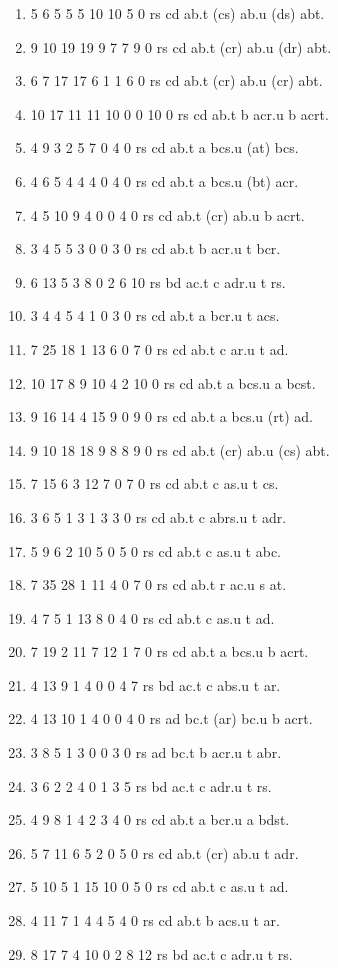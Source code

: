 \documentclass[10pt,journal]{IEEEtran}
\begin{document}
\begin{enumerate}
\item 5 6 5 5 5 10 10 5 0 rs cd ab.t (cs) ab.u (ds) abt.
\item 9 10 19 19 9 7 7 9 0 rs cd ab.t (cr) ab.u (dr) abt.
\item 6 7 17 17 6 1 1 6 0 rs cd ab.t (cr) ab.u (cr) abt.
\item 10 17 11 11 10 0 0 10 0 rs cd ab.t b acr.u b acrt.
\item 4 9 3 2 5 7 0 4 0 rs cd ab.t a bcs.u (at) bcs.
\item 4 6 5 4 4 4 0 4 0 rs cd ab.t a bcs.u (bt) acr.
\item 4 5 10 9 4 0 0 4 0 rs cd ab.t (cr) ab.u b acrt.
\item 3 4 5 5 3 0 0 3 0 rs cd ab.t b acr.u t bcr.
\item 6 13 5 3 8 0 2 6 10 rs bd ac.t c adr.u t rs.
\item 3 4 4 5 4 1 0 3 0 rs cd ab.t a bcr.u t acs.
\item 7 25 18 1 13 6 0 7 0 rs cd ab.t c ar.u t ad.
\item 10 17 8 9 10 4 2 10 0 rs cd ab.t a bcs.u a bcst.
\item 9 16 14 4 15 9 0 9 0 rs cd ab.t a bcs.u (rt) ad.
\item 9 10 18 18 9 8 8 9 0 rs cd ab.t (cr) ab.u (cs) abt.
\item 7 15 6 3 12 7 0 7 0 rs cd ab.t c as.u t cs.
\item 3 6 5 1 3 1 3 3 0 rs cd ab.t c abrs.u t adr.
\item 5 9 6 2 10 5 0 5 0 rs cd ab.t c as.u t abc.
\item 7 35 28 1 11 4 0 7 0 rs cd ab.t r ac.u s at.
\item 4 7 5 1 13 8 0 4 0 rs cd ab.t c as.u t ad.
\item 7 19 2 11 7 12 1 7 0 rs cd ab.t a bcs.u b acrt.
\item 4 13 9 1 4 0 0 4 7 rs bd ac.t c abs.u t ar.
\item 4 13 10 1 4 0 0 4 0 rs ad bc.t (ar) bc.u b acrt.
\item 3 8 5 1 3 0 0 3 0 rs ad bc.t b acr.u t abr.
\item 3 6 2 2 4 0 1 3 5 rs bd ac.t c adr.u t rs.
\item 4 9 8 1 4 2 3 4 0 rs cd ab.t a bcr.u a bdst.
\item 5 7 11 6 5 2 0 5 0 rs cd ab.t (cr) ab.u t adr.
\item 5 10 5 1 15 10 0 5 0 rs cd ab.t c as.u t ad.
\item 4 11 7 1 4 4 5 4 0 rs cd ab.t b acs.u t ar.
\item 8 17 7 4 10 0 2 8 12 rs bd ac.t c adr.u t rs.

\end{enumerate}
\end{document}
